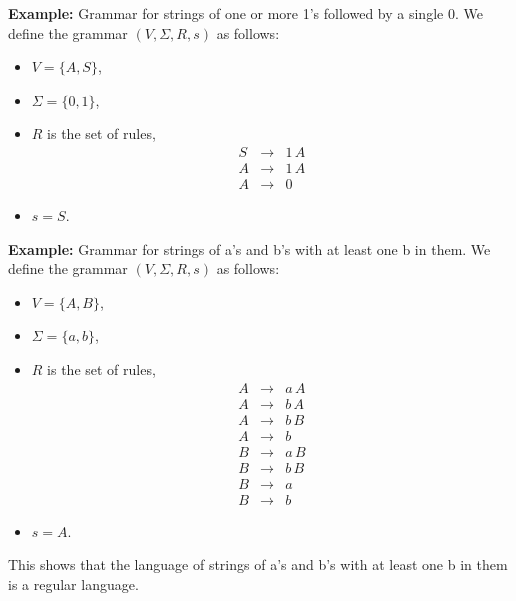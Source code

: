 \documentclass[a4paper,blends,pdf,colorBG,slideColor]{prosper}
\begin{document}
{\bf Example:} Grammar for strings of one or more 1's followed by a single 0.  We define the grammar $(V,\Sigma, R, s)$ as follows:
\begin{itemize}
\item $V = \{ A,S \}$,
\item $\Sigma = \{ 0, 1\}$,
\item $R$ is the set of rules,
{\scriptsize
\[
\begin{array}{rcl}
S & \rightarrow & 1\, A \\
A & \rightarrow & 1\, A \\
A & \rightarrow & 0
\end{array}
\]
}
\item $s = S$.
\end{itemize}

\es


\small
{\bf Example:} Grammar for strings of a's and b's with at least one b in them.  We define the grammar $(V,\Sigma, R, s)$ as follows:
\begin{itemize}
\item $V = \{ A,B \}$,
\item $\Sigma = \{ a, b\}$,
\item $R$ is the set of rules,
{\scriptsize
\[
\begin{array}{rcl}
A & \rightarrow & a\, A \\
 A & \rightarrow &b\, A \\
A & \rightarrow &  b\,B \\
A & \rightarrow &   b\\
B & \rightarrow & a\, B \\
B & \rightarrow &b\, B \\
B & \rightarrow & a \\
B & \rightarrow &  b
\end{array}
\]
}
\item $s = A$.
\end{itemize}

This shows that the language of strings of a's and b's with at least one b in them is a regular language.
\es


\end{document}

